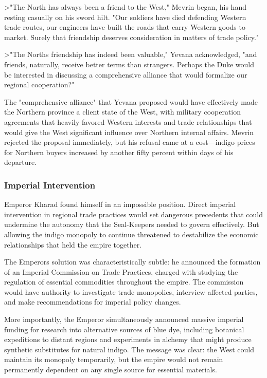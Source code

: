 \textgreater"The North has always been a friend to the West," Mevrin
began, his hand resting casually on his sword hilt. "Our soldiers have
died defending Western trade routes, our engineers have built the roads
that carry Western goods to market. Surely that friendship deserves
consideration in matters of trade policy."

\textgreater"The North\textquotesingle s friendship has indeed been
valuable," Yevana acknowledged, "and friends, naturally, receive better
terms than strangers. Perhaps the Duke would be interested in discussing
a comprehensive alliance that would formalize our regional cooperation?"

The "comprehensive alliance" that Yevana proposed would have effectively
made the Northern province a client state of the West, with military
cooperation agreements that heavily favored Western interests and trade
relationships that would give the West significant influence over
Northern internal affairs. Mevrin rejected the proposal immediately, but
his refusal came at a cost---indigo prices for Northern buyers increased
by another fifty percent within days of his departure.

\subsubsection{Imperial Intervention}\label{imperial-intervention}

Emperor Kharad found himself in an impossible position. Direct imperial
intervention in regional trade practices would set dangerous precedents
that could undermine the autonomy that the Seal-Keepers needed to govern
effectively. But allowing the indigo monopoly to continue threatened to
destabilize the economic relationships that held the empire together.

The Emperor\textquotesingle s solution was characteristically subtle: he
announced the formation of an Imperial Commission on Trade Practices,
charged with studying the regulation of essential commodities throughout
the empire. The commission would have authority to investigate trade
monopolies, interview affected parties, and make recommendations for
imperial policy changes.

More importantly, the Emperor simultaneously announced massive imperial
funding for research into alternative sources of blue dye, including
botanical expeditions to distant regions and experiments in alchemy that
might produce synthetic substitutes for natural indigo. The message was
clear: the West could maintain its monopoly temporarily, but the empire
would not remain permanently dependent on any single source for
essential materials.

